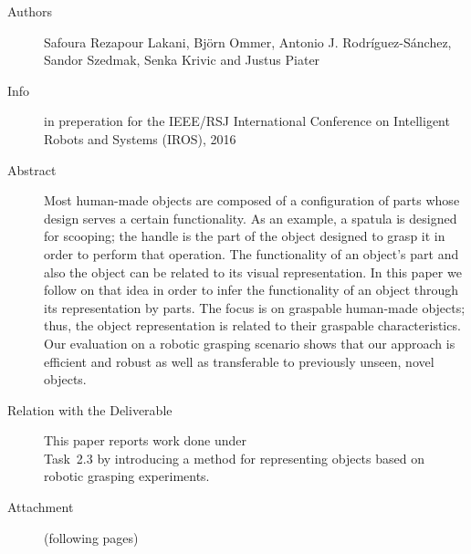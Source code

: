 \documentclass[a4paper,11pt,pdf]{pacmanreport}
\begin{document}
\begin{description}
\item[Authors] Safoura Rezapour Lakani, Bj\"{o}rn Ommer, Antonio J. Rodr\'{i}guez-S\'{a}nchez, Sandor Szedmak, Senka Krivic and Justus Piater
\item[Info] in preperation for the IEEE/RSJ International Conference on Intelligent Robots and Systems (IROS), 2016
\item[Abstract] Most human-made objects are composed of a configuration of parts whose
design serves a certain functionality. As an example, a spatula is
designed for scooping; the handle is the part of the object designed
to grasp it in order to perform that operation. The functionality of
an object's part and also the object can be related to its visual
representation. In this paper we follow on that idea in order to infer
the functionality of an object through its representation by parts.
The focus is on graspable human-made objects; thus, the object
representation is related to their graspable characteristics.
Our evaluation on a robotic grasping scenario shows that our approach
is efficient and robust as well as transferable to previously unseen,
novel objects.
\item[Relation with the Deliverable]\hfill This paper reports work
  done under\\ Task~2.3 by introducing a method for representing
  objects based on robotic grasping experiments.
\item[Attachment] (following pages)
\end{description}

%

\end{document}
